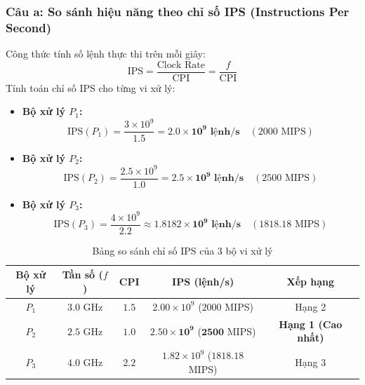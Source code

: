 \documentclass[a4paper]{article}
\numberwithin{figure}{section}
\numberwithin{table}{section}
\begin{document}
\subsubsection*{Câu a: So sánh hiệu năng theo chỉ số IPS (Instructions Per Second)}
Công thức tính số lệnh thực thi trên mỗi giây:
\begin{equation*}
    \text{IPS} = \frac{\text{Clock Rate}}{\text{CPI}} = \frac{f}{\text{CPI}}
\end{equation*}
Tính toán chỉ số IPS cho từng vi xử lý:
\begin{itemize}[leftmargin=*]
    \item \textbf{Bộ xử lý $P_1$:}
    \begin{equation*}
        \text{IPS}(P_1) = \frac{3 \times 10^9}{1.5} = \mathbf{2.0 \times 10^9\text{ lệnh/s}} \quad (2000\text{ MIPS})
    \end{equation*}
    \item \textbf{Bộ xử lý $P_2$:}
    \begin{equation*}
        \text{IPS}(P_2) = \frac{2.5 \times 10^9}{1.0} = \mathbf{2.5 \times 10^9\text{ lệnh/s}} \quad (2500\text{ MIPS})
    \end{equation*}
    \item \textbf{Bộ xử lý $P_3$:}
    \begin{equation*}
        \text{IPS}(P_3) = \frac{4 \times 10^9}{2.2} \approx \mathbf{1.8182 \times 10^9\text{ lệnh/s}} \quad (1818.18\text{ MIPS})
    \end{equation*}
\end{itemize}

\begin{table}[H]
    \centering
    \caption{Bảng so sánh chỉ số IPS của 3 bộ vi xử lý}
    \label{tab:ips_summary}
    \begin{tabular}{|c|c|c|c|c|}
        \hline
        \textbf{Bộ xử lý} & \textbf{Tần số ($f$)} & \textbf{CPI} & \textbf{IPS (lệnh/s)} & \textbf{Xếp hạng} \\
        \hline
        $P_1$ & $3.0\text{ GHz}$ & $1.5$ & $2.00 \times 10^9$ ($2000$ MIPS) & Hạng 2 \\
        \hline
        $P_2$ & $2.5\text{ GHz}$ & $1.0$ & $\mathbf{2.50 \times 10^9}$ ($\mathbf{2500}$ MIPS) & \textbf{Hạng 1 (Cao nhất)} \\
        \hline
        $P_3$ & $4.0\text{ GHz}$ & $2.2$ & $1.82 \times 10^9$ ($1818.18$ MIPS) & Hạng 3 \\
        \hline
    \end{tabular}
\end{table}
\end{document}
